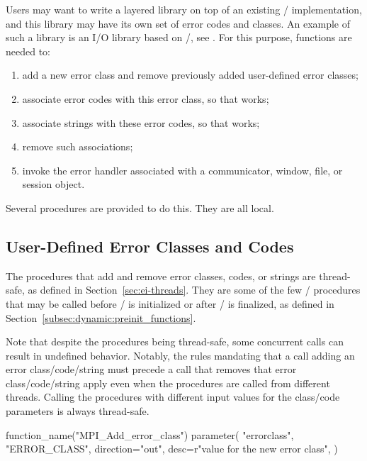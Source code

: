 Users may want to write a layered library on top of an existing \MPI/
implementation, and this library may have its own set of error codes
and classes. An example of such a library is an I/O library based on
\MPI/, see .
For this purpose, functions are needed to:
\begin{enumerate}
\item add a new error class and remove previously added user-defined error classes;
\item associate error codes with this error class, so that  works;
\item associate strings with these error codes, so that  works;
\item remove such associations;
\item invoke the error handler associated with a communicator, window, file, or session object.
\end{enumerate}

\noindent
Several procedures are provided to do this.  They are all local.

\subsection{User-Defined Error Classes and Codes}

The procedures that add and remove error classes, codes, or strings are thread-safe,
as defined in Section~\ref{sec:ei-threads}.
They are some of the few \MPI/ procedures that may be called before \MPI/ is
initialized or after \MPI/ is finalized, as defined in Section~\ref{subsec:dynamic:preinit_functions}.

\begin{users}
Note that despite the procedures being thread-safe, some concurrent calls can result
in undefined behavior. Notably, the rules mandating that a call adding an error
class/code/string must precede a call that removes that error class/code/string apply even
when the procedures are called from different threads. Calling the procedures with different
input values for the class/code parameters is always thread-safe.
\end{users}


\begin{mpi-binding}
    function_name("MPI_Add_error_class")
    parameter(
        "errorclass",
        "ERROR_CLASS",
        direction="out",
        desc=r"value for the new error class",
    )
\end{mpi-binding}

